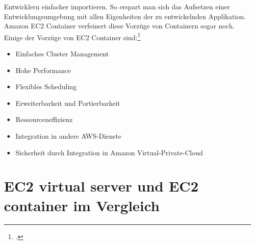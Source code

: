 \documentclass[titlepage]{report}
\begin{document}
Entwicklern einfacher importieren. So erspart man sich das Aufsetzen
einer Entwicklungsumgebung mit allen Eigenheiten der zu entwickelnden
Applikation. Amazon EC2 Container verfeinert diese Vorzüge von
Containern sogar noch. Einige der Vorzüge von EC2 Container
sind:\footcite{container}
\begin{itemize}
    \item Einfaches Cluster Management
    \item Hohe Performance
    \item Flexibles Scheduling
    \item Erweiterbarkeit und Portierbarkeit
    \item Ressourceneffizienz
    \item Integration in andere AWS\hyp{}Dienste
    \item Sicherheit durch Integration in Amazon Virtual\hyp{}Private\hyp{}Cloud
\end{itemize}
\section*{EC2 virtual server und EC2 container im Vergleich}
\end{document}
